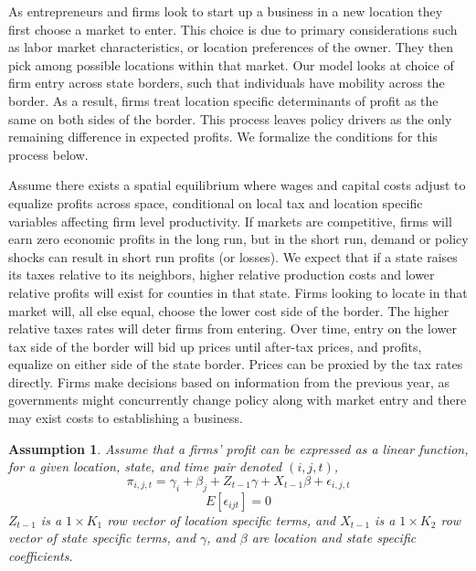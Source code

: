 \documentclass[12pt,a4paper]{article}
\newtheorem{assumption}[theorem]{Assumption}
\begin{document}
As entrepreneurs and firms look to start up a business in a new location they first choose a market to enter. This choice is due to primary considerations such as labor market characteristics, or location preferences of the owner. They then pick among possible locations within that market. Our model looks at choice of firm entry across state borders, such that individuals have mobility across the border. As a result, firms treat location specific determinants of profit as the same on both sides of the border. This process leaves policy drivers as the only remaining difference in expected profits. We formalize the conditions for this process below. 

Assume there exists a spatial equilibrium where wages and capital costs adjust to equalize profits across space, conditional on local tax and location specific variables affecting firm level productivity. If markets are competitive, firms will earn zero economic profits in the long run, but in the short run, demand or policy shocks can result in short run profits (or losses). We expect that if a state raises its taxes relative to its neighbors, higher relative production costs and lower  relative profits will exist for counties in that state.  Firms looking to locate in that market will, all else equal, choose the lower cost side of the border.  The higher relative taxes rates will  deter firms from entering. Over time,  entry on the lower tax side of the border will bid up prices until after-tax prices, and profits, equalize on either side of the state border. Prices can be proxied by the tax rates directly. Firms make decisions based on information from the previous year, as governments might concurrently change policy along with market entry and there may exist costs to establishing a business.

\begin{assumption}
Assume that a firms' profit can be expressed as a linear function, for a given location, state, and time pair denoted $(i,j,t)$,
\begin{equation}
\pi_{i,j,t} =  \gamma_{i}+\beta_{j}+Z_{t-1}\gamma+X_{t-1}\beta+\epsilon_{i,j,t}
\end{equation}
\begin{equation}
E[\epsilon_{ijt}] = 0
\end{equation}
$Z_{t-1}$ is a $1 \times K_{1}$ row vector of location specific terms, and $X_{t-1}$ is a $1 \times K_{2}$ row vector of state specific terms, and $\gamma$, and $\beta$ are location and state specific coefficients.
\end{assumption}
\end{document}
